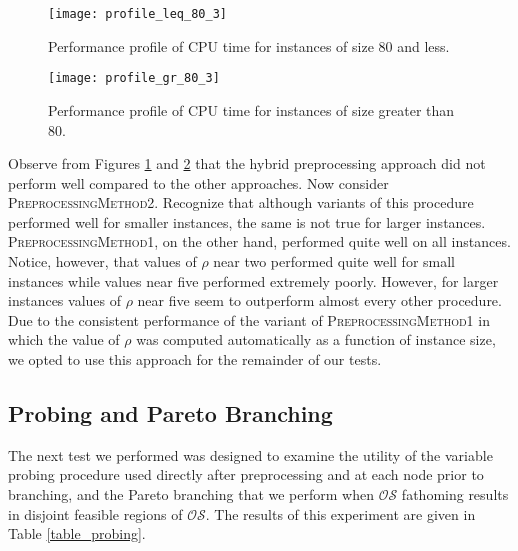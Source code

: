 \documentclass[11.5pt]{article}
\newcommand{\OS}{\mathcal{OS}}
\begin{document}

\begin{figure}[h!]
\centering
\texttt{[image: profile\_leq\_80\_3]}
\caption{Performance profile of CPU time for instances of size 80 and less.}
\label{prof_60}
\end{figure}

\begin{figure}[h!]
\centering
\texttt{[image: profile\_gr\_80\_3]}
\caption{Performance profile of CPU time for instances of size greater than 80.}
\label{prof_80}
\end{figure}

Observe from Figures \ref{prof_60} and \ref{prof_80} that the hybrid preprocessing approach did not perform well compared to the other approaches. Now consider \textsc{PreprocessingMethod2}. Recognize that although variants of this procedure performed well for smaller instances, the same is not true for larger instances. \textsc{PreprocessingMethod1}, on the other hand, performed quite well on all instances. Notice, however, that values of $\rho$ near two performed quite well for small instances while values near five performed extremely poorly. However, for larger instances values of $\rho$ near five seem to outperform almost every other procedure. Due to the consistent performance of the variant of \textsc{PreprocessingMethod1} in which the value of $\rho$ was computed automatically as a function of instance size, we opted to use this approach for the remainder of our tests.

\subsection{Probing and Pareto Branching}

The next test we performed was designed to examine the utility of the variable probing procedure used directly after preprocessing and at each node prior to branching, and the Pareto branching that we perform when $\OS$ fathoming results in disjoint feasible regions of $\OS$. The results of this experiment are given in Table \ref{table_probing}.
\end{document}
